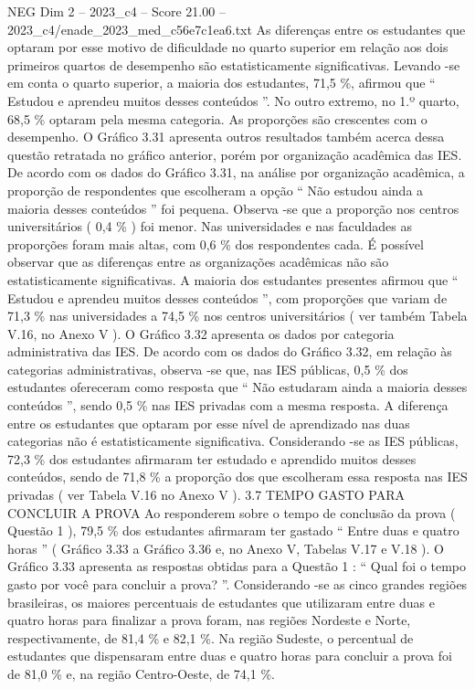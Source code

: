 \begin{textsample}{NEG Dim 2 – 2023\_c4 – Score 21.00 – 2023\_c4/enade\_2023\_med\_c56e7c1ea6.txt}
As diferenças entre os estudantes que optaram por esse motivo de dificuldade no quarto superior em relação aos dois primeiros quartos de desempenho são estatisticamente significativas.
Levando -se em conta o quarto superior, a maioria dos estudantes, 71,5 \%, afirmou que “ Estudou e aprendeu muitos desses conteúdos ”.
No outro extremo, no 1.º quarto, 68,5 \% optaram pela mesma categoria.
As proporções são crescentes com o desempenho.
O Gráfico 3.31 apresenta outros resultados também acerca dessa questão retratada no gráfico anterior, porém por organização acadêmica das IES.
De acordo com os dados do Gráfico 3.31, na análise por organização acadêmica, a proporção de respondentes que escolheram a opção “ Não estudou ainda a maioria desses conteúdos ” foi pequena.
Observa -se que a proporção nos centros universitários ( 0,4 \% ) foi menor.
Nas universidades e nas faculdades as proporções foram mais altas, com 0,6 \% dos respondentes cada.
É possível observar que as diferenças entre as organizações acadêmicas não são estatisticamente significativas.
A maioria dos estudantes presentes afirmou que “ Estudou e aprendeu muitos desses conteúdos ”, com proporções que variam de 71,3 \% nas universidades a 74,5 \% nos centros universitários ( ver também Tabela V.16, no Anexo V ).
O Gráfico 3.32 apresenta os dados por categoria administrativa das IES.
De acordo com os dados do Gráfico 3.32, em relação às categorias administrativas, observa -se que, nas IES públicas, 0,5 \% dos estudantes ofereceram como resposta que “ Não estudaram ainda a maioria desses conteúdos ”, sendo 0,5 \% nas IES privadas com a mesma resposta.
A diferença entre os estudantes que optaram por esse nível de aprendizado nas duas categorias não é estatisticamente significativa.
Considerando -se as IES públicas, 72,3 \% dos estudantes afirmaram ter estudado e aprendido muitos desses conteúdos, sendo de 71,8 \% a proporção dos que escolheram essa resposta nas IES privadas ( ver Tabela V.16 no Anexo V ). 3.7 TEMPO GASTO PARA CONCLUIR A PROVA Ao responderem sobre o tempo de conclusão da prova ( Questão 1 ), 79,5 \% dos estudantes afirmaram ter gastado “ Entre duas e quatro horas ” ( Gráfico 3.33 a Gráfico 3.36 e, no Anexo V, Tabelas V.17 e V.18 ).
O Gráfico 3.33 apresenta as respostas obtidas para a Questão 1 : “ Qual foi o tempo gasto por você para concluir a prova? ”.
Considerando -se as cinco grandes regiões brasileiras, os maiores percentuais de estudantes que utilizaram entre duas e quatro horas para finalizar a prova foram, nas regiões Nordeste e Norte, respectivamente, de 81,4 \% e 82,1 \%.
Na região Sudeste, o percentual de estudantes que dispensaram entre duas e quatro horas para concluir a prova foi de 81,0 \% e, na região Centro-Oeste, de 74,1 \%.

\end{textsample}
